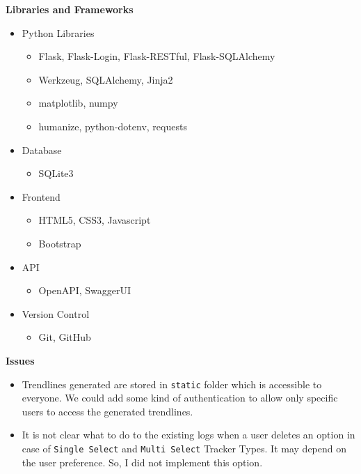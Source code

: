 \documentclass{article}
\begin{document}
\vspace{1cm}
{\huge \textbf{Libraries and Frameworks}}\\
\begin{itemize}
    \item Python Libraries
        \begin{itemize}
            \item Flask, Flask-Login, Flask-RESTful, Flask-SQLAlchemy
            \item Werkzeug, SQLAlchemy, Jinja2
            \item matplotlib, numpy
            \item humanize, python-dotenv, requests
        \end{itemize}
    \item Database
        \begin{itemize}
            \item SQLite3
        \end{itemize}
    \item Frontend
        \begin{itemize}
            \item HTML5, CSS3, Javascript
            \item Bootstrap
        \end{itemize}
    \item API
        \begin{itemize}
            \item OpenAPI, SwaggerUI
        \end{itemize}
    \item Version Control
        \begin{itemize}
            \item Git, GitHub
        \end{itemize}
\end{itemize}

\vspace{1cm}
{\huge \textbf{Issues}}\\
\begin{itemize}
    \item Trendlines generated are stored in \verb|static| folder which is accessible to everyone. We could add some kind of authentication to allow only specific users to access the generated trendlines.
    \item It is not clear what to do to the existing logs when a user deletes an option in case of \verb|Single Select| and \verb|Multi Select| Tracker Types. It may depend on the user preference. So, I did not implement this option.
\end{itemize}
\end{document}
